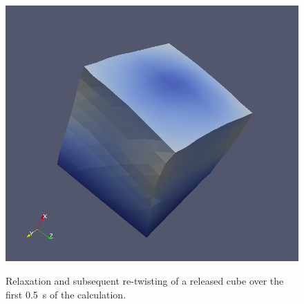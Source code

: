 \begin{figure}
{      \includegraphics[width=\smallfig]{chapters/narayanan/images/png/release_400.png}
      }
    \caption{Relaxation and subsequent re-twisting of a released cube
      over the first 0.5~s of the calculation.}
  \label{fig:narayanan:releasedcube}
\end{figure}

